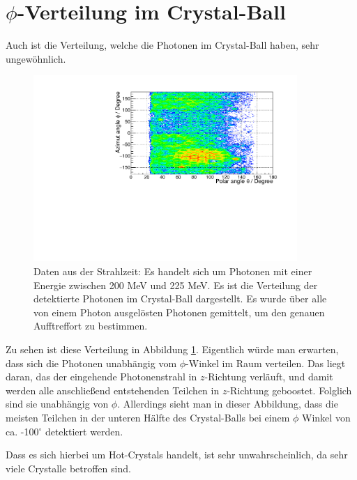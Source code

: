 \documentclass[a4paper,11pt,oneside,final,german,openbib,pdftex]{scrbook}
\begin{document}
{\section{$\phi$-Verteilung im Crystal-Ball}

Auch ist die Verteilung, welche die Photonen im Crystal-Ball haben, sehr ungew\"ohnlich.

\begin{figure}[h!]
	\begin{center}
		\includegraphics[width=100mm]{NewCalib/ThetaPhiVerteilung/20172404ThetaPhi200MeVBeam}
		\caption[Strahlzeit: Verteilung der detektierten Photonen im CB]{Daten aus der Strahlzeit: Es handelt sich um Photonen mit einer Energie zwischen 200 MeV und 225 MeV. Es ist die Verteilung der detektierte Photonen im Crystal-Ball dargestellt. Es wurde \"uber alle von einem Photon ausgel\"osten Photonen gemittelt, um den genauen Aufftreffort zu bestimmen.}
		\label{fig:Verteilung-der-Photonen-im-CB}
	\end{center}
\end{figure}
Zu sehen ist diese Verteilung in Abbildung \ref{fig:Verteilung-der-Photonen-im-CB}. Eigentlich w\"urde man erwarten, dass sich die Photonen unabh\"angig vom $\phi$-Winkel im Raum verteilen. Das liegt daran, das der eingehende Photonenstrahl in $z$-Richtung verl\"auft, und damit werden alle anschlie{\ss}end entstehenden Teilchen in $z$-Richtung geboostet. Folglich sind sie unabh\"angig von $\phi$. 
Allerdings sieht man in dieser Abbildung, dass die meisten Teilchen in der unteren H\"alfte des Crystal-Balls bei einem $\phi$ Winkel von ca. -100$^{\circ}$ detektiert werden.


Dass es sich hierbei um Hot-Crystals handelt, ist sehr unwahrscheinlich, da sehr viele Crystalle betroffen sind.

}
\end{document}
